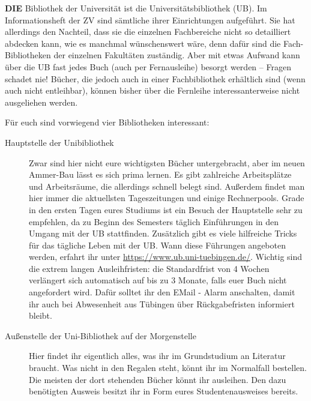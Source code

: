 \textbf{DIE} Bibliothek der Universität ist die
  Universitätsbibliothek (UB).  Im Informationsheft der ZV sind
  sämtliche ihrer Einrichtungen auf\-ge\-führt.  Sie hat
  allerdings den Nachteil, dass sie die einzelnen Fachbereiche nicht so
  detailliert abdecken kann, wie es manchmal wünschenswert wäre,
  denn dafür sind die Fach-Bibliotheken der einzelnen Fakultäten
  zuständig.  Aber mit etwas Aufwand kann über die UB fast jedes Buch
  (auch per Fernausleihe) besorgt werden -- Fragen schadet nie!
  Bücher, die jedoch auch in einer Fachbibliothek erhältlich sind
  (wenn auch nicht entleihbar), können bisher über die Fernleihe
  interessanterweise nicht ausgeliehen werden.

Für euch sind vorwiegend vier Bibliotheken interessant:
\begin{description}
\item[Hauptstelle der Unibibliothek] Zwar sind hier nicht eure wichtigsten
     Bücher untergebracht, aber im neuen Ammer-Bau lässt es sich prima
     lernen. Es gibt zahlreiche Arbeitsplätze und Arbeitsräume, die
     allerdings schnell belegt sind. Außerdem findet man hier immer die
     aktuellsten Tageszeitungen und einige Rechnerpools.
     Grade in den ersten Tagen eures Studiums ist ein Besuch der Hauptstelle
     sehr zu empfehlen, da zu Beginn des Semesters täglich Einführungen in den Umgang
     mit der UB stattfinden. Zusätzlich gibt es viele hilfreiche Tricks für
     das tägliche Leben mit der UB. Wann diese Führungen angeboten werden,
     erfahrt ihr unter  \url{https://www.ub.uni-tuebingen.de/}. Wichtig sind die extrem langen Ausleihfristen: die Standardfrist von 4 Wochen verlängert sich automatisch auf bis zu 3 Monate, falls euer Buch nicht angefordert wird. Dafür solltet ihr den EMail - Alarm anschalten, damit ihr auch bei Abwesenheit aus Tübingen über Rückgabefristen informiert bleibt. 

\item[Außenstelle der Uni-Bibliothek auf der Morgenstelle]
     Hier findet ihr eigentlich alles, was ihr im Grundstudium an
     Literatur braucht.  Was nicht in den Regalen steht, könnt ihr
     im Normalfall bestellen.  Die meisten der dort stehenden Bücher könnt ihr
     ausleihen. Den dazu benötigten Ausweis besitzt ihr in Form eures Studentenausweises bereits.


\end{description}
